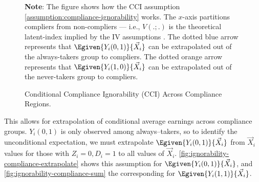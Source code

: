 \begin{figure}[h!]
    \centering
    \caption{Conditional Compliance Ignorability (CCI) Across Compliance Regions.}
    \label{fig:ignorability-compliance-extrapolate}
    \justify
    \footnotesize
    \textbf{Note}:
    The figure shows how the CCI assumption \ref{assumption:compliance-ignorability} works.
    The $x$-axis partitions compliers from non-compliers --- i.e., $V(.;.)$ is the theoretical latent-index implied by the IV assumptions \citep{vytlacil2002independence}. 
    The dotted blue arrow represents that $\Egiven{Y_i(0,1)}{\vec{X}_i}$ can be extrapolated out of the always-takers group to compliers.
    The dotted orange arrow represents that $\Egiven{Y_i(1,0)}{\vec{X}_i}$ can be extrapolated out of the never-takers group to compliers.
\end{figure}

This allows for extrapolation of conditional average earnings across compliance groups.
$Y_i(0, 1)$ is only observed among always--takers, so to identify the unconditional expectation, we must extrapolate $\Egiven{Y_i(0,1)}{\vec X_i}$ from $\vec X_i$ values for those with $Z_i = 0, D_i = 1$ to all values of $\vec X_i$.
\autoref{fig:ignorability-compliance-extrapolate} shows this assumption for $\Egiven{Y_i(0,1)}{\vec X_i}$, and \autoref{fig:ignorability-compliance-sum} the corresponding for $\Egiven{Y_i(1,1)}{\vec X_i}$.

